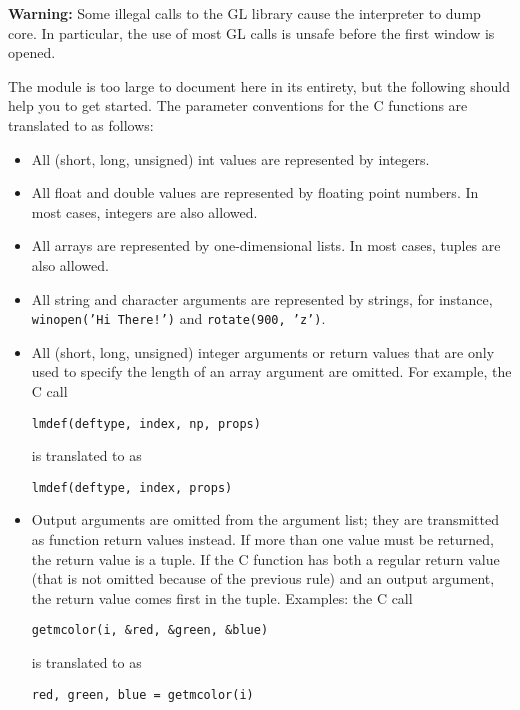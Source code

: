 {\bf Warning:}
Some illegal calls to the GL library cause the {\Python} interpreter to dump
core.
In particular, the use of most GL calls is unsafe before the first
window is opened.

The module is too large to document here in its entirety, but the
following should help you to get started.
The parameter conventions for the C functions are translated to {\Python} as
follows:

\begin{itemize}
\item
All (short, long, unsigned) int values are represented by {\Python}
integers.
\item
All float and double values are represented by {\Python} floating point
numbers.
In most cases, {\Python} integers are also allowed.
\item
All arrays are represented by one-dimensional {\Python} lists.
In most cases, tuples are also allowed.
\item
\begin{sloppypar}
All string and character arguments are represented by {\Python} strings,
for instance,
{\tt winopen('Hi~There!')}
and
{\tt rotate(900,~'z')}.
\end{sloppypar}
\item
All (short, long, unsigned) integer arguments or return values that are
only used to specify the length of an array argument are omitted.
For example, the C call
\bcode\begin{verbatim}
lmdef(deftype, index, np, props)
\end{verbatim}\ecode
is translated to {\Python} as
\bcode\begin{verbatim}
lmdef(deftype, index, props)
\end{verbatim}\ecode
\item
Output arguments are omitted from the argument list; they are
transmitted as function return values instead.
If more than one value must be returned, the return value is a tuple.
If the C function has both a regular return value (that is not omitted
because of the previous rule) and an output argument, the return value
comes first in the tuple.
Examples: the C call
\bcode\begin{verbatim}
getmcolor(i, &red, &green, &blue)
\end{verbatim}\ecode
is translated to {\Python} as
\bcode\begin{verbatim}
red, green, blue = getmcolor(i)
\end{verbatim}\ecode
\end{itemize}

